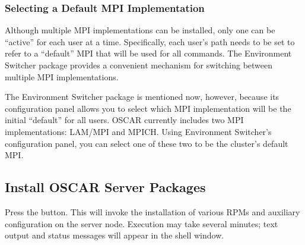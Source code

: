 
\subsubsection{Selecting a Default MPI Implementation}
\label{det:configure-packages-switcher}

Although multiple MPI implementations can be installed, only one can
be ``active'' for each user at a time.  Specifically, each user's path
needs to be set to refer to a ``default'' MPI that will be used for
all commands.  The Environment Switcher package provides a convenient
mechanism for switching between multiple MPI implementations.

The Environment Switcher package is mentioned now, however, because
its configuration panel allows you to select which MPI implementation
will be the initial ``default'' for all users.  OSCAR currently
includes two MPI implementations: LAM/MPI and MPICH.  Using
Environment Switcher's configuration panel, you can select one of
these two to be the cluster's default MPI.



\subsection{Install OSCAR Server Packages}
\label{det:install-server-packages}

Press the  button.  This will
invoke the installation of various RPMs and auxiliary configuration on
the server node.  Execution may take several minutes; text output
and status messages will appear in the shell window.

